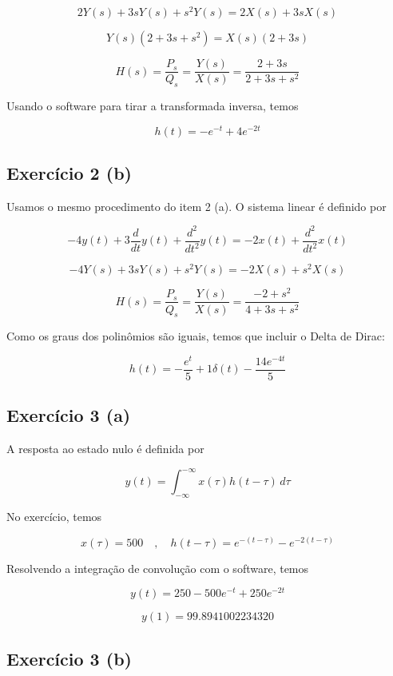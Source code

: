 \documentclass[12pt]{scrartcl}
\begin{document}
\[ 2 Y(s) + 3 s Y(s) + s^2 Y(s) = 2 X(s) + 3sX(s) \] 

\[ Y(s) \left(2 + 3s + s^2\right) = X(s) \left(2 + 3s\right) \] 

\[ H(s) = \frac{P_s}{Q_s} = \frac{Y(s)}{X(s)} = \frac{2 + 3s}{2 + 3s + s^2}\] 

Usando o software para tirar a transformada inversa, temos  

\[ h(t) = - e^{- t} + 4 e^{- 2 t} \]

\subsection*{Exercício 2 (b)}

Usamos o mesmo procedimento do item 2 (a). O sistema linear é definido por 

\[ - 4 y{\left(t \right)} + 3 \frac{d}{d t} y{\left(t \right)} + \frac{d^{2}}{d t^{2}} y{\left(t \right)} = - 2 x{\left(t \right)} + \frac{d^{2}}{d t^{2}} x{\left(t \right)} \]

\[ - 4 Y(s) + 3 s Y(s) + s^2Y(s) = -2X(s) + s^2X(s) \]

\[ H(s) = \frac{P_s}{Q_s} = \frac{Y(s)}{X(s)} = \frac{-2 + s^2}{4 + 3s + s^2}\] 

Como os graus dos polinômios são iguais, temos que incluir o Delta de Dirac:

\[ h(t) = - \frac{e^{t}}{5} + 1 \delta (t) - \frac{14 e^{- 4 t}}{5} \]

\subsection*{Exercício 3 (a)}

A resposta ao estado nulo é definida por 

\[  y(t) = \int_{-\infty}^{-\infty} x(\tau) h(t - \tau) \,d\tau \]

No exercício, temos 

\[ x(\tau) = 500 \quad , \quad h(t - \tau) = e^{-(t - \tau)} - e^{-2(t - \tau)} \]

Resolvendo a integração de convolução com o software, temos

\[ y(t) = 250 - 500 e^{- t} + 250 e^{- 2 t} \]

\[ y(1) = 99.8941002234320 \]

\subsection*{Exercício 3 (b)}
\end{document}
